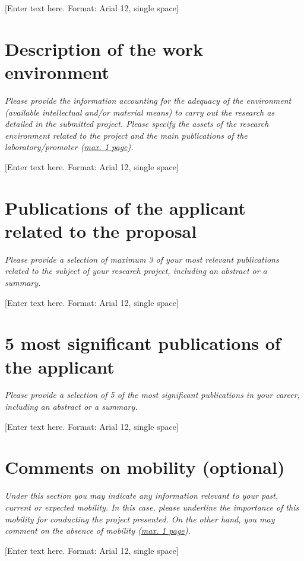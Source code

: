 \documentclass{fnrscq}
\begin{document}
[Enter text here. Format: Arial 12, single space]

\section{Description of the work environment}

\textit{\footnotesize Please provide the information accounting for the adequacy of the
  environment (available intellectual and/or material means) to carry out the research as
  detailed in the submitted project. Please specify the assets of the research environment
  related to the project and the main publications of the laboratory/promoter (\uline{max. 1
    page}).}

[Enter text here. Format: Arial 12, single space]

\section{Publications of the applicant related to the proposal}

\textit{\footnotesize Please provide a selection of maximum 3 of your most relevant
  publications related to the subject of your research project, including an abstract or a
  summary.}

[Enter text here. Format: Arial 12, single space]

\section{5 most significant publications of the applicant}

\textit{\footnotesize Please provide a selection of 5 of the most significant publications
  in your career, including an abstract or a summary.}

[Enter text here. Format: Arial 12, single space]

\section{Comments on mobility (optional)}

\textit{\footnotesize Under this section you may indicate any information relevant to your
  past, current or expected mobility. In this case, please underline the importance of this
  mobility for conducting the project presented. On the other hand, you may comment on the
  absence of mobility (\uline{max. 1 page}).}

[Enter text here. Format: Arial 12, single space]
\end{document}
